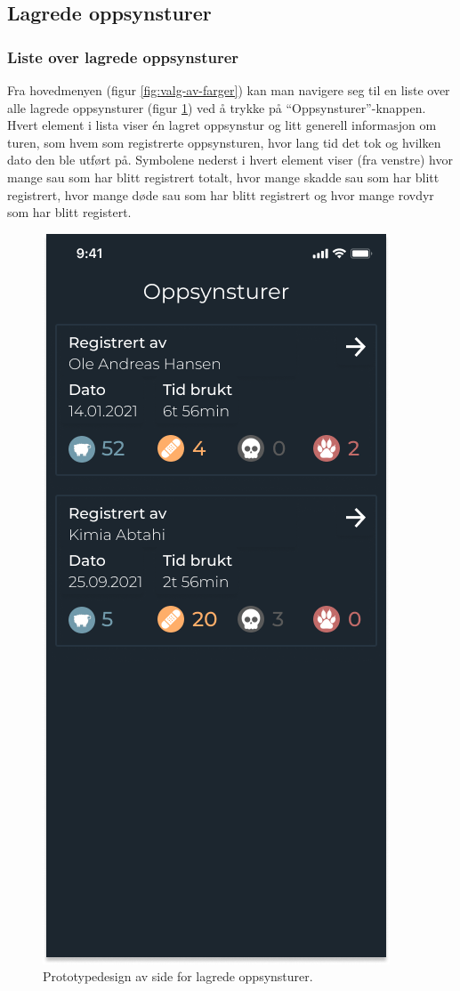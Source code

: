 \subsection{Lagrede oppsynsturer}
\subsubsection{Liste over lagrede oppsynsturer}
Fra hovedmenyen (figur \ref{fig:valg-av-farger}) kan man navigere seg til en liste over alle lagrede oppsynsturer (figur \ref{fig:figma-oppsynsturer-liste}) ved å trykke på \enquote{Oppsynsturer}-knappen. Hvert element i lista viser én lagret oppsynstur og litt generell informasjon om turen, som hvem som registrerte oppsynsturen, hvor lang tid det tok og hvilken dato den ble utført på. Symbolene nederst i hvert element viser (fra venstre) hvor mange sau som har blitt registrert totalt, hvor mange skadde sau som har blitt registrert, hvor mange døde sau som har blitt registrert og hvor mange rovdyr som har blitt registert.

\begin{figure}[H]
\centering
\captionsetup{width=.8\linewidth}
\includegraphics[scale=0.4]{Figurer/Figma/Frame 6 - Oppsynsturer.png}
\caption{Prototypedesign av side for lagrede oppsynsturer.}
\label{fig:figma-oppsynsturer-liste}
\end{figure}

